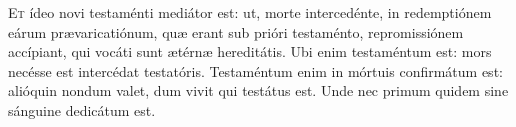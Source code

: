 
\lettrine{E}{t} ídeo novi testaménti mediátor est: ut, morte intercedénte, in redemptiónem eárum prævaricatiónum, quæ erant sub prióri testaménto, repromissiónem accípiant, qui vocáti sunt ætérnæ hereditátis. 
Ubi enim testaméntum est: mors necésse est intercédat testatóris. 
Testaméntum enim in mórtuis confirmátum est: alióquin nondum valet, dum vivit qui testátus est. 
Unde nec primum quidem sine sánguine dedicátum est.